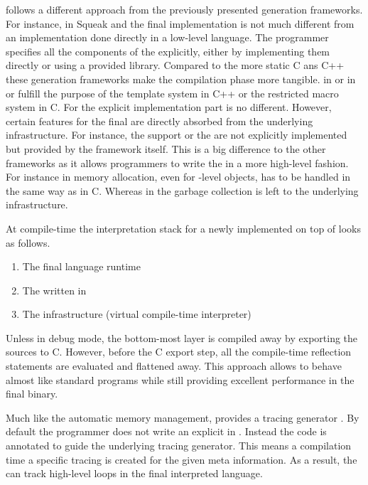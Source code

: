 \PyPy follows a different approach from the previously presented \VM generation frameworks.
For instance, in Squeak and \Jikes the final \VM implementation is not much different from an implementation done directly in a low-level language.
The programmer specifies all the components of the \VM explicitly, either by implementing them directly or using a provided library.
Compared to the more static C ans C++ these \VM generation frameworks make the compilation phase more tangible.
\ST in \Squeak or \Java in \Jikes or \Maxine fulfill the purpose of the template system in C++ or the restricted macro system in C.
For the explicit implementation part \PyPy is no different.
However, certain features for the final \VM are directly absorbed from the underlying \PyPy infrastructure.
For instance, the \JIT support or the \GC are not explicitly implemented but provided by the \PyPy framework itself.
This is a big difference to the other \VM frameworks as it allows programmers to write the \VM in a more high-level fashion.
For instance in \Squeak memory allocation, even for \VM-level objects, has to be handled in the same way as in C.
Whereas in \PyPy the garbage collection is left to the underlying infrastructure.

At compile-time the interpretation stack for a newly implemented \VM on top of \PyPy looks as follows.
%
\begin{enumerate}
\item The final language runtime
\item The \VM written in \RPython
\item The \PyPy infrastructure (virtual compile-time \RPython interpreter)
\end{enumerate}
%
Unless in debug mode, the bottom-most layer is compiled away by exporting the \RPython sources to C.
However, before the C export step, all the compile-time reflection statements are evaluated and flattened away.
This approach allows \RPython \VMs to behave almost like standard \Python programs while still providing excellent performance in the final \VM binary.

Much like the automatic memory management, \PyPy provides a tracing \JIT generator \cite{Bolz09a}.
By default the \VM programmer does not write an explicit \JIT in \PyPy.
Instead the \VM code is annotated to guide the underlying tracing \JIT generator.
This means a \VM compilation time a specific tracing \JIT is created for the given meta information.
As a result, the \JIT can track high-level loops in the final interpreted language.


